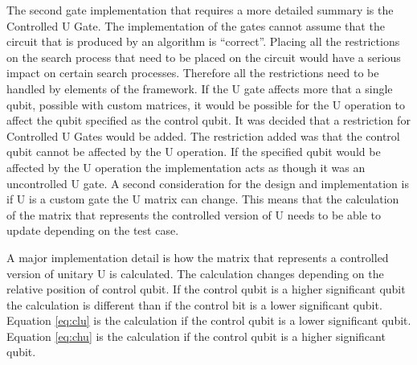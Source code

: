 The second gate implementation that requires a more detailed summary is the Controlled U Gate.
The implementation of the gates cannot assume that the circuit that is produced by an algorithm is ``correct''.
Placing all the restrictions on the search process that need to be placed on the circuit would have a serious impact on certain search processes.
Therefore all the restrictions need to be handled by elements of the framework.
If the U gate affects more that a single qubit, possible with custom matrices, it would be possible for the U operation to affect the qubit specified as the control qubit.
It was decided that a restriction for Controlled U Gates would be added.
The restriction added was that the control qubit cannot be affected by the U operation.
If the specified qubit would be affected by the U operation the implementation acts as though it was an uncontrolled U gate.
A second consideration for the design and implementation is if U is a custom gate the U matrix can change.
This means that the calculation of the matrix that represents the controlled version of U needs to be able to update depending on the test case.

A major implementation detail is how the matrix that represents a controlled version of unitary U is calculated.
The calculation changes depending on the relative position of control qubit.
If the control qubit is a higher significant qubit the calculation is different than if the control bit is a lower significant qubit.
Equation \ref{eq:clu} is the calculation if the control qubit is a lower significant qubit.
Equation \ref{eq:chu} is the calculation if the control qubit is a higher significant qubit.


